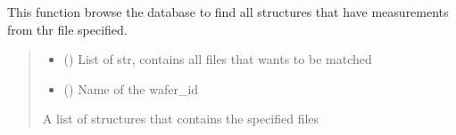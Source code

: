 \documentclass[letterpaper,10pt,english]{sphinxmanual}
\begin{document}

\begin{fulllineitems}
\label{\detokenize{filter:filter.filter_by_filename}}
\pysigstartsignatures
{}
\pysigstopsignatures
\sphinxAtStartPar
This function browse the database to find all structures that have measurements from thr file specified.
\begin{quote}\begin{description}
\begin{itemize}
\item {} 
\sphinxAtStartPar
{} () \textendash{} List of str, contains all files that wants to be matched

\item {} 
\sphinxAtStartPar
{} () \textendash{} Name of the wafer\_id

\end{itemize}

\sphinxAtStartPar
A list of structures that contains the specified files

\end{description}\end{quote}

\end{fulllineitems}

\end{document}
